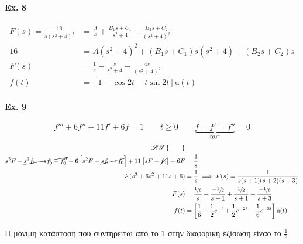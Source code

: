 \documentclass[11pt,a4paper,titlepage,fleqn]{article}
\begin{document}
    \paragraph{Ex. 8}
    \begin{align*}
    F(s) = \frac{16}{s(s^2+4)^2} &=
    \frac{A}{s} + \frac{B_1s + C_1}{s^2+4} + \frac{B_2s+C_2}{(s^2+4)^2} \\
    16 &= A(s^2+4)^2 + (B_1s+C_1)s(s^2+4) + (B_2s+C_2)s \\
    F(s) &= \frac{1}{s} - \frac{s}{s^2+4} - \frac{4s}{(s^2+4)^2} \\
    f(t) &= \left[ 1-\cos 2t - t\sin 2t \right] \mathrm u(t)
    \end{align*}
    
    \paragraph{Ex. 9}
    \[
    f''' + 6f'' + 11f' + 6f = 1 \qquad t\geq 0 \qquad
    \underbrace{f=f'=f''}_{@ 0^-}=0
    \]
    \begin{align*}
    \mathscr{LT}\left\lbrace \qquad \right\rbrace & \\
    s^3F - \cancel{s^2f_0 - sf_0' -f_0''}
    +6 \left[ s^2F-\cancel{sf_0-f_0} \right]
     + 11 \left[ sF - \cancel{f_0} \right] + 6F
    &= \frac{1}{s} \\
    F(s^3+6s^2+11s+6)&= \frac{1}{s}
    \implies F(s) = \frac{1}{s(s+1)(s+2)(s+3)}
    \\ F(s) &= \frac{\sfrac{1}{6} }{s}
    + \frac{-\sfrac{1}{2} }{s+1}
    + \frac{\sfrac{1}{2} }{s+1}
    + \frac{-\sfrac{1}{6} }{s+3} \\
    f(t) &= \left[
    \frac{1}{6}-\frac{1}{2}e^{-t}+\frac{1}{2}e^{-2t}-\frac{1}{6}e^{-3t}
    \right]\mathrm u(t)
    \end{align*}
    
    Η μόνιμη κατάσταση που συντηρείται από το 1 στην διαφορική εξίσωση είναο το
    \( \frac{1}{6} \)
\end{document}

